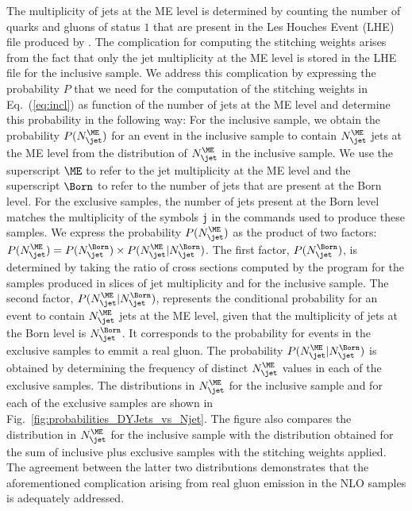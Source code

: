 The multiplicity of jets at the ME level is determined by counting the number of quarks and gluons of status $1$ 
that are present in the \textrm{Les Houches Event} (LHE)~\cite{Alwall:2006yp} file produced by \MGvATNLO.
The complication for computing the stitching weights arises from the fact that only the jet multiplicity at the ME level is stored in the LHE file for the inclusive sample.
We address this complication by expressing the probability $P$ that we need for the computation of the stitching weights in Eq.~(\ref{eq:incl})
as function of the number of jets at the ME level and determine this probability in the following way:
For the inclusive sample, we obtain the probability $P(N_{\jet}^{\ME})$ for an event in the inclusive sample
to contain $N_{\jet}^{\ME}$ jets at the ME level 
from the distribution of $N_{\jet}^{\ME}$ in the inclusive sample.
We use the superscript $\ME$ to refer to the jet multiplicity at the ME level
and the superscript $\Born$ to refer to the number of jets that are present at the Born level.
For the exclusive samples, the number of jets present at the Born level matches the multiplicity of the symbols \texttt{j} in the \MGvATNLO commands
used to produce these samples.
We express the probability $P(N_{\jet}^{\ME})$ as the product of two factors: $P(N_{\jet}^{\ME}) = P(N_{\jet}^{\Born}) \times P(N_{\jet}^{\ME} \vert N_{\jet}^{\Born})$.
The first factor, $P(N_{\jet}^{\Born})$, is determined by taking the ratio of cross sections computed by the program \MGvATNLO 
for the samples produced in slices of jet multiplicity and for the inclusive sample.
The second factor, $P(N_{\jet}^{\ME} \vert N_{\jet}^{\Born})$, represents the conditional probability for an event to contain $N_{\jet}^{\ME}$ jets at the ME level,
given that the multiplicity of jets at the Born level is $N_{\jet}^{\Born}$.
It corresponds to the probability for events in the exclusive samples to emmit a real gluon.
The probability $P(N_{\jet}^{\ME} \vert N_{\jet}^{\Born})$ is obtained by determining the frequency of distinct $N_{\jet}^{\ME}$ values 
in each of the exclusive samples.
The distributions in $N_{\jet}^{\ME}$ for the inclusive sample and for each of the exclusive samples
are shown in Fig.~\ref{fig:probabilities_DYJets_vs_Njet}.
The figure also compares the distribution in $N_{\jet}^{\ME}$ for the inclusive sample
with the distribution obtained for the sum of inclusive plus exclusive samples with the stitching weights applied.
The agreement between the latter two distributions demonstrates that the aforementioned complication arising from real gluon emission in the NLO samples
is adequately addressed.

